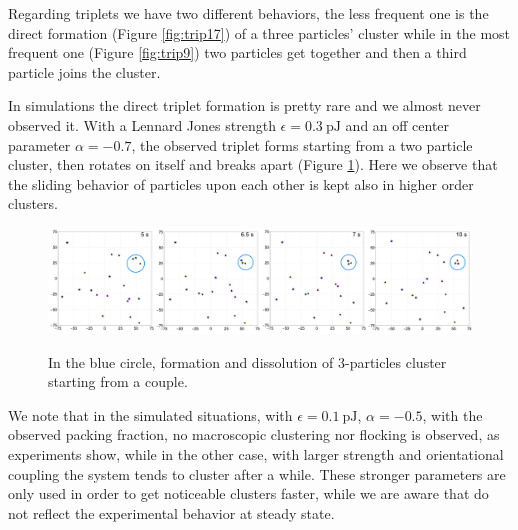 \documentclass[../../master_thesis_np.tex]{subfiles}
\begin{document}
	Regarding triplets we have two different behaviors, the less frequent one is the direct formation (Figure \ref{fig:trip17}) of a three particles' cluster while in the most frequent one (Figure \ref{fig:trip9}) two particles get together and then a third particle joins the cluster.
	
	In simulations the direct triplet formation is pretty rare and we almost never observed it.
	With a Lennard Jones strength $\epsilon = \SI{0.3}{\pico\joule}$ and an off center parameter $\alpha = -0.7$, the observed triplet forms starting from a two particle cluster, then rotates on itself and breaks apart (Figure \ref{fig:simtrip}).
	Here we observe that the sliding behavior of particles upon each other is kept also in higher order clusters.
	
	\begin{figure}[hbtp]
		\centering
		\includegraphics[width = \textwidth]{qual/simtrip.png}
		\label{fig:simtrip}
		\caption{In the blue circle, formation and dissolution of 3-particles cluster starting from a couple.}
	\end{figure}

	We note that in the simulated situations, with $\epsilon = \SI{0.1}{\pico\joule}$, $\alpha = -0.5$, with the observed packing fraction, no macroscopic clustering nor flocking is observed, as experiments show, while in the other case, with larger strength and orientational coupling the system tends to cluster after a while.
	These stronger parameters are only used in order to get noticeable clusters faster, while we are aware that do not reflect the experimental behavior at steady state.
	
\end{document}
